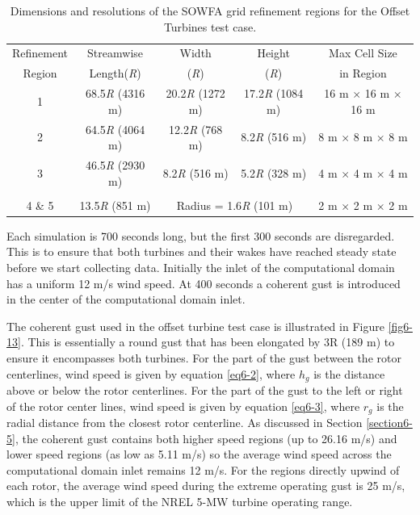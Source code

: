 \begin{table} [ht]
\centering
\begin{tabular}{c c c c c}
\hline
Refinement & Streamwise  & Width & Height & Max Cell Size\\
Region & Length(\emph{R}) & (\emph{R})  &  (\emph{R}) & in Region\\
\hline
1 & 68.5\emph{R} (4316 m)  & 20.2\emph{R} (1272 m) & 17.2\emph{R} (1084 m) & 16 m $\times$ 16 m $\times$ 16 m\\
2 & 64.5\emph{R} (4064 m)  & 12.2\emph{R} (768 m) & 8.2\emph{R} (516 m)  & 8 m $\times$ 8 m $\times$ 8 m\\
3 & 46.5\emph{R} (2930 m)  & 8.2\emph{R} (516 m) & 5.2\emph{R} (328 m)  & 4 m $\times$ 4 m $\times$ 4 m\\
\\
4 \& 5 & 13.5\emph{R} (851 m)    & \multicolumn{2}{c}{Radius = 1.6\emph{R} (101 m)}   & 2 m $\times$ 2 m $\times$ 2 m\\
\hline
\end{tabular}
\caption{ Dimensions and resolutions of the SOWFA grid refinement regions for the Offset Turbines test case.}
\label{Table6-1}
\end{table}

Each simulation is 700 seconds long, but the first 300 seconds are disregarded. This is to ensure that both turbines and their wakes have reached steady state before we start collecting data. Initially the inlet of the computational domain has a uniform 12 m/s wind speed. At 400 seconds a coherent gust is introduced in the center of the computational domain inlet. 

The coherent gust used in the offset turbine test case is illustrated in Figure \ref{fig6-13}. This is essentially a round gust that has been elongated by 3R (189 m) to ensure it encompasses both turbines. For the part of the gust between the rotor centerlines,  wind speed is given by equation \ref{eq6-2}, where $h_g$ is the distance above or below the rotor centerlines. For the part of the gust to the left or right of the rotor center lines, wind speed is given by equation \ref{eq6-3}, where $r_g$ is the radial distance from the closest rotor centerline. As discussed in Section \ref{section6-5}, the coherent gust contains both higher speed regions (up to 26.16 m/s) and lower speed regions (as low as 5.11 m/s) so the average wind speed across the computational domain inlet remains 12 m/s. For the regions directly upwind of each rotor, the average wind speed during the extreme operating gust is 25 m/s, which is the upper limit of the NREL 5-MW turbine operating range. 

